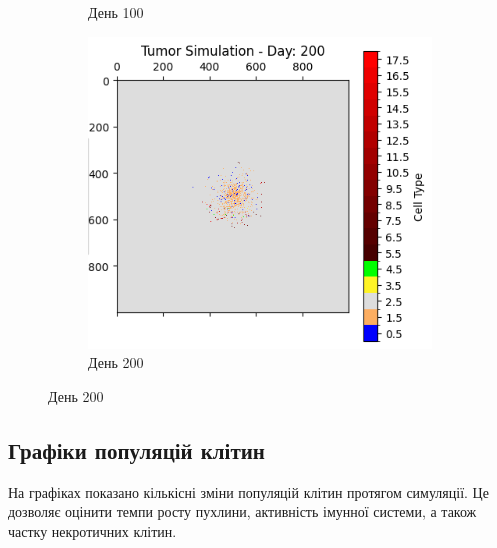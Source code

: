 \documentclass{article}
\begin{document}
\begin{figure}[H]
\begin{subfigure}[t]{0.32\linewidth}
        \caption{День 100}
        \label{fig:tumor-day-100-immune}
    \end{subfigure}
    \hfill
    \begin{subfigure}[t]{0.32\linewidth}
        \centering
        \includegraphics[width=\linewidth]{tumor_immune_simulation_stats/tumor_immune_day_200.png}
        \caption{День 200}
        \label{fig:tumor-day-200-immune}
    \end{subfigure}
    \label{fig:tumor-evolution-immune}
\end{figure}

\subsection{Графіки популяцій клітин}
На графіках показано кількісні зміни популяцій клітин протягом симуляції. Це дозволяє оцінити темпи росту пухлини, активність імунної системи, а також частку некротичних клітин.
\end{document}
